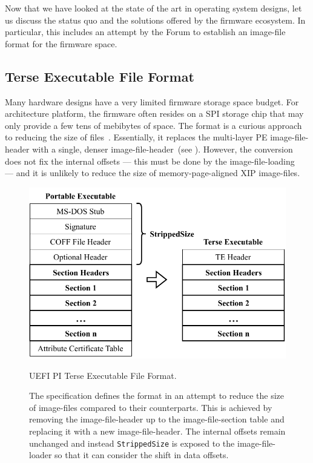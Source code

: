 Now that we have looked at the state of the art in operating system designs, let us discuss the status quo and the solutions offered by the  \gls{firmware} ecosystem. In particular, this includes an attempt by the  Forum to establish an \gls{image-file} format for the \gls{firmware} space.

\subsection{Terse Executable File Format}
\label{sec:te}

Many hardware designs have a very limited \gls{firmware} storage space budget. For  architecture platform, the \gls{firmware} often resides on a \gls{SPI} storage chip that may only provide a few tens of mebibytes of space. The  format is a curious approach to reducing the size of  files~\cite{pi-spec}. Essentially, it replaces the multi-layer \gls{PE} \gls{image-file-header} with a single, denser \gls{image-file-header}~(see ). However, the conversion does not fix the internal offsets --- this must be done by the \gls{image-file-loading}~\cite{pi-spec,edk2} --- and it is unlikely to reduce the size of \gls{memory-page}-aligned \gls{XIP} \glspl{image-file}.

\begin{figure}[htb]
  \centering
  \includegraphics{Figures/PEvsTE.pdf}
  \caption{UEFI PI Terse Executable File Format.}
  \label{fig:pe-vs-te}
  \caption*{The  specification defines the  format in an attempt to reduce the size of \glspl{image-file} compared to their  counterparts. This is achieved by removing the  \gls{image-file-header} up to the  \gls{image-file-section} table and replacing it with a new  \gls{image-file-header}. The internal offsets remain unchanged and instead \texttt{StrippedSize} is exposed to the \gls{image-file-loader} so that it can consider the shift in data offsets.}
\end{figure}

